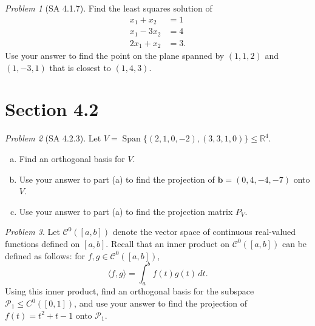 \documentclass[11pt]{paper}
\theoremstyle{remark}
\newtheorem{problem}{Problem}
\newtheorem*{solution}{{\bf Solution}}
\newcommand\R{\fld{R}}
\renewcommand{\vec}[1]{\mathbf{#1}}
\newcommand{\<}{\ensuremath{\langle}}
\renewcommand{\>}{\ensuremath{\rangle}}
\newcommand\fld[1]{\ensuremath{\mathbb{#1}}}
\newcommand\vb{\vec{b}}
\newcommand\Span{\ensuremath{\operatorname{Span}}}
\begin{document}
\probskip %


\begin{problem}[SA 4.1.7]
Find the least squares solution of
\begin{align*}
x_1 +x_2 &= 1\\
x_1 - 3x_2 &= 4\\
2x_1 +x_2 &= 3.
\end{align*}
Use your answer to find the point on the plane spanned by $(1, 1, 2)$ and 
$(1, -3, 1)$ that is closest to $(1, 4, 3)$. 
\end{problem}


\probskip %
\section*{Section 4.2}
\begin{problem}[SA 4.2.3]
Let $V = \Span \{(2, 1, 0, -2), (3, 3, 1, 0)\}\leq \R^4$.
\begin{enumerate}[(a)]
\item 
Find an orthogonal basis for $V$.
\item Use your answer to part (a) to find the projection of 
  $\vb = (0, 4, -4, -7)$ onto $V$.
\item Use your answer to part (a) to find the projection matrix $P_V$.
\end{enumerate}
\end{problem}

\probskip %

\begin{problem}
Let $\mathcal{C}^0([a, b])$ denote the vector space of continuous real-valued
functions defined on $[a,b]$. Recall that an inner product on 
$\mathcal{C}^0([a, b])$ can be defined as follows: 
for $f, g \in \mathcal{C}^0([a, b])$,
\[
\<f, g\> =
\int^b_a f(t)g(t)\, dt.
\]
Using this inner product, find an orthogonal basis for the 
subspace $\mathcal{P}_1 \leq C^0([0, 1])$,
and use your answer to find the projection
of $f(t) = t^2 + t - 1$ onto $\mathcal{P}_1$.
\end{problem}
\end{document}
